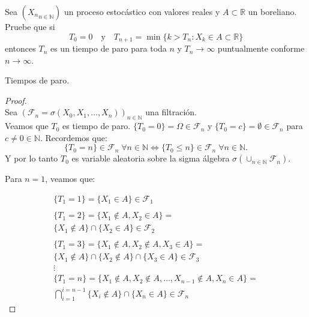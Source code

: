 \begin{problema}
	Sea $\left({X_n}_{n\in\mathbb{N}}\right)$ un proceso estocástico con valores reales y $A\subset \mathbb{R}$ un boreliano. 
	Pruebe que si
	$$T_0=0\quad\text{y}\quad T_{n+1}=\min\{k>T_n: X_k\in A \subset \mathbb{R}\}$$
	entonces $T_n$ es un tiempo de paro para toda $n$ y $T_n\to \infty$ puntualmente conforme $n\to\infty$. 

	\begin{categoria} 
		Tiempos de paro.
	\end{categoria}
\end{problema}
		
\begin{proof}
\\

	Sea $(\mathscr{F}_n = \sigma(  X_0, X_1, \dots, X_n ))_{ n \in \mathbb{N}}$ una filtración.
\\

	Veamos que $T_0$ es tiempo de paro. $\{T_0 = 0\} = \Omega \in \mathscr{F}_n$ y 
	$\{T_0 = c\} = \emptyset \in \mathscr{F}_n$ para $c \not= 0 \in \mathbb{N}$. Recordemos que:		
	\begin{equation}\label{problema_1_1:equivalencia_varable_aleatoria}
		\{T_0 = n\} \in \mathscr{F}_n \; \forall n \in \mathbb{N} \iff 
		\{T_0 \leq n\} \in \mathscr{F}_n \; \forall n \in \mathbb{N}.
	\end{equation}
	Y por lo tanto $T_0$ es variable aleatoria sobre la sigma álgebra $\sigma(\cup_{n \in \mathbb{N}} 
	\mathscr{F}_n)$.

	Para $n=1$, veamos que:
 
	\begin{gather*}
			\{T_1 = 1\} = \{ X_1 \in A \} 
			\in \mathscr{F}_1 
		\\	\\
			\{T_1 = 2\} = \{ X_1 \not\in A, X_2 \in A \} = \\ 
			\{ X_1 \not\in A \} \cap \{X_2 \in A \}  
			\in \mathscr{F}_2	
		\\ \\
			\{T_1 = 3\} = 
			\{ X_1 \not\in A, X_2 \not\in A,  X_3 \in A \} = \\
			\{ X_1 \not\in A \} \cap \{ X_2 \not\in A \} \cap \{X_3 \in A \} 
			\in \mathscr{F}_3
		\\
			\vdots
		\\
			\{T_1 = n\} = 
			\{ X_1 \not\in A, X_2 \not\in A, \dots, X_{n-1} \not\in A, X_n \in A \} = \\
			\bigcap_{i=1}^{i=n-1} \{ X_i \not\in A \} \cap \{X_n \in A \} 
			\in \mathscr{F}_n
	\end{gather*} 
 

\end{proof}
